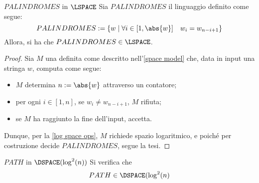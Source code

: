 \documentclass[a4paper, 12pt]{report}
\begin{document}
    \begin{framedthm}{$PALINDROMES$ in $\LSPACE$}
        Sia $PALINDROMES$ il linguaggio definito come segue: $$PALINDROMES := \{w \mid \forall i \in [1, \abs{w}] \quad w_i = w_{n - i + 1}\}$$ Allora, si ha che $PALINDROMES \in \LSPACE$.
    \end{framedthm}

    \begin{proof}
        Sia $M$ una \TM definita come descritto nell'\cref{space model} che, data in input una stringa $w$, computa come segue:

        \begin{itemize}
            \item $M$ determina $n := \abs{w}$ attraverso un contatore;
            \item per ogni $i \in [1, n]$, se $w_ i \neq w_{n - i + 1}$, $M$ rifiuta;
            \item se $M$ ha raggiunto la fine dell'input, accetta.
        \end{itemize}

        Dunque, per la \cref{log space ops}, $M$ richiede spazio logaritmico, e poiché per costruzione decide $PALINDROMES$, segue la tesi.
    \end{proof}

    \begin{framedthm}{$PATH$ in $\DSPACE(\log^2(n))$}
        Si verifica che $$PATH \in \DSPACE(\log^2(n)$$
    \end{framedthm}
\end{document}
